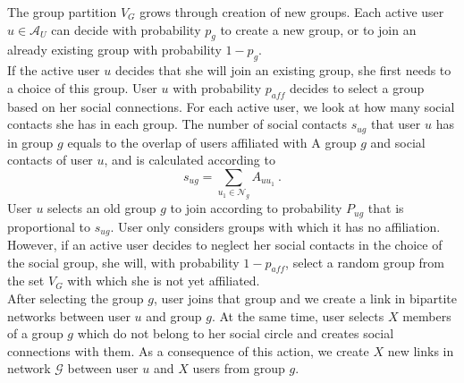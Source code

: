The group partition $V_{G}$ grows through creation of new groups. Each active user $u\in \mathcal{A}_{U}$ can decide with probability $p_{g}$ to create a new group, or to join an already existing group with probability $1-p_{g}$. \\


If the active user $u$ decides that she will join an existing group, she first needs to a choice of this group. User $u$ with probability $p_{aff}$ decides to select a group based on her social connections. For each active user, we look at how many social contacts she has in each group. The number of social contacts $s_{ug}$ that user $u$ has in group $g$ equals to the overlap of users affiliated with A group $g$ and social contacts of user $u$, and is calculated according to
\begin{equation}
s_{ug}=\sum_{u_{1}\in \mathcal{N}_{g}}
A_{uu_{1}} \label{eq1} \ .
\end{equation}
User $u$ selects an old group $g$ to join according to probability $P_{ug}$ that is proportional to $s_{ug}$. User only considers groups with which it has no affiliation. However, if an active user decides to neglect her social contacts in the choice of the social group, she will, with probability $1-p_{aff}$, select a random group from the set $V_{G}$ with which she is not yet affiliated. \\

After selecting the group $g$, user joins that group and we create a link in bipartite networks between user $u$ and group $g$. At the same time, user selects $X$ members of a group $g$ which do not belong to her social circle and creates social connections with them. As a consequence of this action, we create $X$ new links in network $\mathcal{G}$ between user $u$ and $X$ users from group $g$.\\

